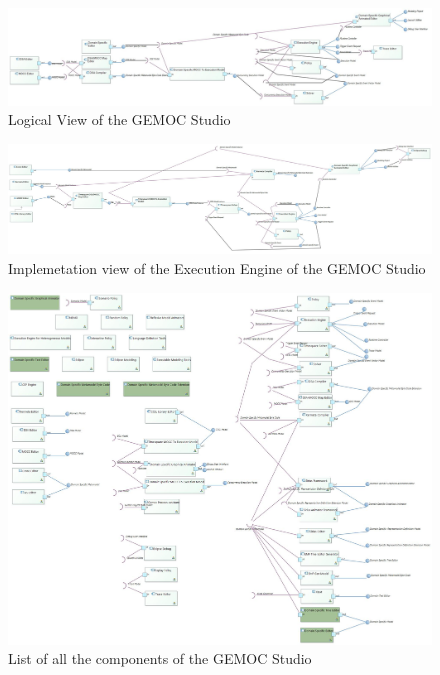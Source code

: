 \documentclass{gemoc} %
\begin{document}
\begin{figure}[htp]
	\begin{center}
	\includegraphics*[trim=0.0cm 0.0cm 0cm 0.0cm, clip=true, angle=90, totalheight=0.9\textheight]{../images/Logical View.jpg}
	\caption{Logical View of the GEMOC Studio}
	\label{fig:LogicalView}
	\end{center}
\end{figure}
\begin{figure}[htp]
	\begin{center}
	\includegraphics*[trim=0.0cm 0.0cm 0cm 0.0cm, clip=true, angle=90, totalheight=0.9\textheight]{../images/TimesquareImplementation.jpg}
	\caption{Implemetation view of the Execution Engine of the GEMOC Studio}
	\label{fig:TimesquareImplementation}
	\end{center}
\end{figure}
\begin{figure}[htp]
	\begin{center}
	\includegraphics*[trim=0.0cm 0.0cm 0cm 0.0cm, clip=true, width=1.0\linewidth]{../images/All Components list.jpg}
	\caption{List of all the components of the GEMOC Studio}
	\label{fig:AllComponentList}
	\end{center}
\end{figure}
\end{document}
